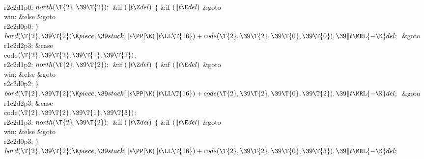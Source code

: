 \\{r2c2d1p0}:\5
${}\\{north}(\T{2},\39\T{2});{}$\6
\&{if} ${}(\|t\Z\\{del}){}$\5
${}\{{}$\5
\1\&{if} ${}(\|t\E\\{del}){}$\1\5
\&{goto} \\{win};\5
\2\&{else}\1\5
\&{goto} \\{r2c2d0p0};\5
\2${}\}{}$\2\6
${}\\{bord}(\T{2},\39\T{2})\K\\{piece},\39\\{stack}[\|s\PP]\K(\|t\LL\T{16})+%
\\{code}(\T{2},\39\T{2},\39\T{0},\39\T{0}),\39\|t\MRL{-{\K}}\\{del};{}$\6
\&{goto} \\{r1c2d2p3};\6
\4\&{case} \\{code}${}(\T{2},\39\T{2},\39\T{1},\39\T{2}){}$:\5
\\{r2c2d1p2}:\5
${}\\{north}(\T{2},\39\T{2});{}$\6
\&{if} ${}(\|t\Z\\{del}){}$\5
${}\{{}$\5
\1\&{if} ${}(\|t\E\\{del}){}$\1\5
\&{goto} \\{win};\5
\2\&{else}\1\5
\&{goto} \\{r2c2d0p2};\5
\2${}\}{}$\2\6
${}\\{bord}(\T{2},\39\T{2})\K\\{piece},\39\\{stack}[\|s\PP]\K(\|t\LL\T{16})+%
\\{code}(\T{2},\39\T{2},\39\T{0},\39\T{2}),\39\|t\MRL{-{\K}}\\{del};{}$\6
\&{goto} \\{r1c2d2p3};\6
\4\&{case} \\{code}${}(\T{2},\39\T{2},\39\T{1},\39\T{3}){}$:\5
\\{r2c2d1p3}:\5
${}\\{north}(\T{2},\39\T{2});{}$\6
\&{if} ${}(\|t\Z\\{del}){}$\5
${}\{{}$\5
\1\&{if} ${}(\|t\E\\{del}){}$\1\5
\&{goto} \\{win};\5
\2\&{else}\1\5
\&{goto} \\{r2c2d0p3};\5
\2${}\}{}$\2\6
${}\\{bord}(\T{2},\39\T{2})\K\\{piece},\39\\{stack}[\|s\PP]\K(\|t\LL\T{16})+%
\\{code}(\T{2},\39\T{2},\39\T{0},\39\T{3}),\39\|t\MRL{-{\K}}\\{del};{}$\6
